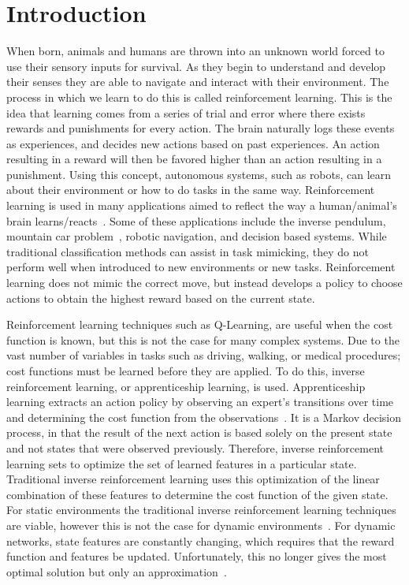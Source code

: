 \documentclass[12pt,american]{report}
\begin{document}
\chapter{Introduction}
\label{sec:introduction}
When born, animals and humans are thrown into an unknown world forced to use their sensory inputs for survival. As they begin to understand and develop their senses they are able to  navigate  and  interact  with  their  environment.  The  process  in which  we  learn  to  do  this  is  called  reinforcement  learning.  This is  the  idea  that  learning  comes  from  a  series  of  trial  and  error where  there  exists  rewards  and  punishments  for  every  action. The brain naturally logs these events as experiences, and decides new  actions  based  on  past  experiences. An  action  resulting  in  a reward  will  then  be  favored higher than  an  action  resulting  in a  punishment.  Using  this  concept,  autonomous  systems,  such  as robots, can learn about their environment or how to do tasks in the same way. Reinforcement learning is used in many applications aimed to reflect the way a human/animal's brain learns/reacts~\cite{atari}.  Some of these applications include the inverse pendulum, mountain car problem~\cite{sutton1996generalization}, robotic navigation, and decision based systems.  While traditional classification methods can assist in task mimicking, they do not perform well when introduced to new environments or new tasks.  Reinforcement learning does not mimic the correct move, but instead develops a policy to choose actions to obtain the highest reward based on the current state.
		    
Reinforcement learning techniques such as Q-Learning, are useful when the cost function is known, but this is not the case for many complex systems. Due to the vast number of variables in tasks such as driving, walking, or medical procedures; cost functions must be learned before they are applied.  To do this, inverse reinforcement learning, or apprenticeship learning, is used. Apprenticeship learning extracts an action policy by observing an expert's transitions over time and determining the cost function from the observations~\cite{ngoinverse}. It is a Markov decision process, in that the result of the next action is based solely on the present state and not states that were observed previously. Therefore, inverse reinforcement learning sets to optimize the set of learned features in a particular state. Traditional inverse reinforcement learning uses this optimization of the linear combination of these features to determine the cost function of the given state. For static environments the traditional inverse reinforcement learning techniques are viable, however this is not the case for dynamic environments~\cite{vasquez2014inverse}. For dynamic networks, state features are constantly changing, which requires that the reward function and features be updated.   Unfortunately, this no longer gives the most optimal solution but only an approximation~\cite{vasquez2014inverse}. 
		
\end{document}
